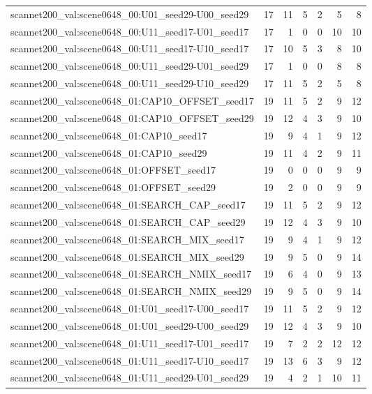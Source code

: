 \begin{table}[t]
\begin{tabular}{lrrrrrr}
scannet200\_val:scene0648\_00:U01\_seed29-U00\_seed29 & 17 & 11 & 5 & 2 & 5 & 8 \\
scannet200\_val:scene0648\_00:U11\_seed17-U01\_seed17 & 17 & 1 & 0 & 0 & 10 & 10 \\
scannet200\_val:scene0648\_00:U11\_seed17-U10\_seed17 & 17 & 10 & 5 & 3 & 8 & 10 \\
scannet200\_val:scene0648\_00:U11\_seed29-U01\_seed29 & 17 & 1 & 0 & 0 & 8 & 8 \\
scannet200\_val:scene0648\_00:U11\_seed29-U10\_seed29 & 17 & 11 & 5 & 2 & 5 & 8 \\
scannet200\_val:scene0648\_01:CAP10\_OFFSET\_seed17 & 19 & 11 & 5 & 2 & 9 & 12 \\
scannet200\_val:scene0648\_01:CAP10\_OFFSET\_seed29 & 19 & 12 & 4 & 3 & 9 & 10 \\
scannet200\_val:scene0648\_01:CAP10\_seed17 & 19 & 9 & 4 & 1 & 9 & 12 \\
scannet200\_val:scene0648\_01:CAP10\_seed29 & 19 & 11 & 4 & 2 & 9 & 11 \\
scannet200\_val:scene0648\_01:OFFSET\_seed17 & 19 & 0 & 0 & 0 & 9 & 9 \\
scannet200\_val:scene0648\_01:OFFSET\_seed29 & 19 & 2 & 0 & 0 & 9 & 9 \\
scannet200\_val:scene0648\_01:SEARCH\_CAP\_seed17 & 19 & 11 & 5 & 2 & 9 & 12 \\
scannet200\_val:scene0648\_01:SEARCH\_CAP\_seed29 & 19 & 12 & 4 & 3 & 9 & 10 \\
scannet200\_val:scene0648\_01:SEARCH\_MIX\_seed17 & 19 & 9 & 4 & 1 & 9 & 12 \\
scannet200\_val:scene0648\_01:SEARCH\_MIX\_seed29 & 19 & 9 & 5 & 0 & 9 & 14 \\
scannet200\_val:scene0648\_01:SEARCH\_NMIX\_seed17 & 19 & 6 & 4 & 0 & 9 & 13 \\
scannet200\_val:scene0648\_01:SEARCH\_NMIX\_seed29 & 19 & 9 & 5 & 0 & 9 & 14 \\
scannet200\_val:scene0648\_01:U01\_seed17-U00\_seed17 & 19 & 11 & 5 & 2 & 9 & 12 \\
scannet200\_val:scene0648\_01:U01\_seed29-U00\_seed29 & 19 & 12 & 4 & 3 & 9 & 10 \\
scannet200\_val:scene0648\_01:U11\_seed17-U01\_seed17 & 19 & 7 & 2 & 2 & 12 & 12 \\
scannet200\_val:scene0648\_01:U11\_seed17-U10\_seed17 & 19 & 13 & 6 & 3 & 9 & 12 \\
scannet200\_val:scene0648\_01:U11\_seed29-U01\_seed29 & 19 & 4 & 2 & 1 & 10 & 11 \\

\end{tabular}
\end{table}
